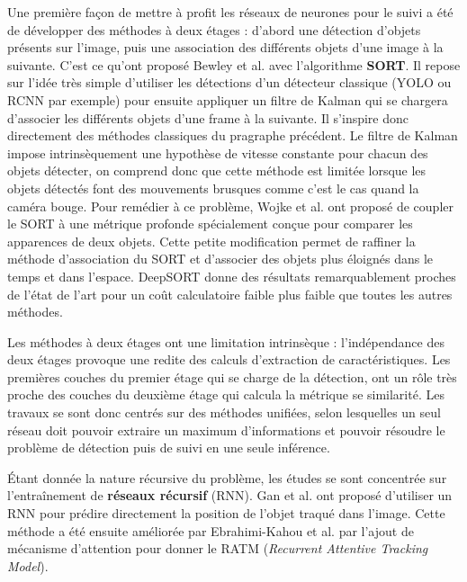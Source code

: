 \documentclass[10pt,twocolumn,letterpaper,french]{article}
\begin{document}
Une première façon de mettre à profit les réseaux de neurones pour le suivi a été de développer des méthodes à deux étages : d'abord une détection d'objets présents sur l'image, puis une association des différents objets d'une image à la suivante. C'est ce qu'ont proposé Bewley et al. \cite{SORT} avec l'algorithme \textbf{SORT}. Il repose sur l'idée très simple d'utiliser les détections d'un détecteur classique (YOLO ou RCNN par exemple) pour ensuite appliquer un filtre de Kalman qui se chargera d'associer les différents objets d'une frame à la suivante. Il s'inspire donc directement des méthodes classiques du pragraphe précédent. Le filtre de Kalman impose intrinsèquement une hypothèse de vitesse constante pour chacun des objets détecter, on comprend donc que cette méthode est limitée lorsque les objets détectés font des mouvements brusques comme c'est le cas quand la caméra bouge. Pour remédier à ce problème, Wojke et al. \cite{deepSORT} ont proposé de coupler le SORT à une métrique profonde spécialement conçue pour comparer les apparences de deux objets. Cette petite modification permet de raffiner la méthode d'association du SORT et d'associer des objets plus éloignés dans le temps et dans l'espace. DeepSORT donne des résultats remarquablement proches de l'état de l'art pour un coût calculatoire faible plus faible que toutes les autres méthodes.

Les méthodes à deux étages ont une limitation intrinsèque : l'indépendance des deux étages provoque une redite des calculs d'extraction de caractéristiques. Les premières couches du premier étage qui se charge de la détection, ont un rôle très proche des couches du deuxième étage qui calcula la métrique se similarité. Les travaux se sont donc centrés sur des méthodes unifiées, selon lesquelles un seul réseau doit pouvoir extraire un maximum d'informations et pouvoir résoudre le problème de détection puis de suivi en une seule inférence.

Étant donnée la nature récursive du problème, les études se sont concentrée sur l’entraînement de \textbf{réseaux récursif} (RNN). Gan et al. \cite{RNNtracking} ont proposé d'utiliser un RNN pour prédire directement la position de l'objet traqué dans l'image. Cette méthode a été ensuite améliorée par Ebrahimi-Kahou et al. \cite{RATM} par l'ajout de mécanisme d'attention pour donner le RATM (\textit{Recurrent Attentive Tracking Model}). \\
\end{document}

